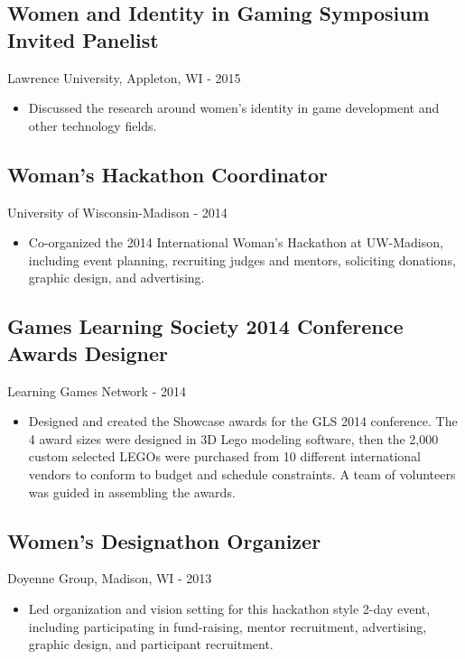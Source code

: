\documentclass[../main.tex]{subfiles}
\begin{document}
\subsection*{Women and Identity in Gaming Symposium Invited Panelist}
     Lawrence University, Appleton, WI - 2015
\begin{itemize}
		\item{Discussed the research around women's identity in game development and other technology fields.}
	\end{itemize}

\subsection*{Woman's Hackathon Coordinator}
     University of Wisconsin-Madison - 2014
\begin{itemize}
		\item{Co-organized the 2014 International Woman's Hackathon at UW-Madison, including event planning, recruiting judges and mentors, soliciting donations, graphic design, and advertising.}
	\end{itemize}

\subsection*{Games Learning Society 2014 Conference Awards Designer}
     Learning Games Network - 2014
\begin{itemize}
		\item{Designed and created the Showcase awards for the GLS 2014 conference. The 4 award sizes were designed in 3D Lego modeling software, then the 2,000 custom selected LEGOs were purchased from 10 different international vendors to conform to budget and schedule constraints. A team of volunteers was guided in assembling the awards.}
	\end{itemize}

	\subsection*{Women's Designathon Organizer}
	Doyenne Group, Madison, WI - 2013
	\begin{itemize}
		\item{Led organization and vision setting for this hackathon style 2-day event, including participating in fund-raising, mentor recruitment, advertising, graphic design, and participant recruitment.}
	\end{itemize}
\end{document}
